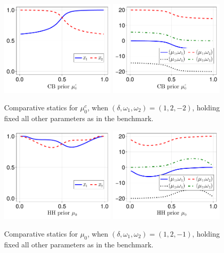 \documentclass[12pt,a4paper]{article}
\begin{document}
\begin{figure}[H]
\centering
\includegraphics[width=0.49\textwidth]{figures/V8/γ_10/fig_optimal_π_across_μ_0_c_ω_1_2_ω_2_-2_δ_1.0_.pdf}
\includegraphics[width=0.49\textwidth]{figures/V8/γ_10/fig_posterior_across_μ_0_c_ω_1_2_ω_2_-2_δ_1.0_.pdf}
\caption{Comparative statics for $\mu_0^c$, when $(\delta,\omega_1,\omega_2)=(1,2,-2)$, holding fixed all other parameters as in the benchmark.}
\label{FigureA14}
\end{figure}

\begin{figure}[H]
\centering
\includegraphics[width=0.49\textwidth]{figures/V8/γ_10/fig_optimal_π_across_μ_0_ω_1_2_ω_2_-1_δ_1.0_.pdf}
\includegraphics[width=0.49\textwidth]{figures/V8/γ_10/fig_posterior_across_μ_0_ω_1_2_ω_2_-1_δ_1.0_.pdf}
\caption{Comparative statics for $\mu_0$, when $(\delta,\omega_1,\omega_2)=(1,2,-1)$, holding fixed all other parameters as in the benchmark.}
\label{FigureA15}
\end{figure}
\end{document}
